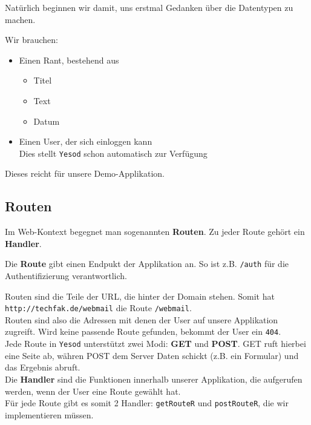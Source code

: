 \documentclass{beamer}
\begin{document}
\begin{frame}[fragile]
Natürlich beginnen wir damit, uns erstmal Gedanken über die Datentypen zu machen.
\pause
\bigskip

Wir brauchen:
\pause

\begin{itemize}
 \item Einen Rant, bestehend aus
       \begin{itemize}
        \item Titel
        \item Text
        \item Datum
       \end{itemize}
 \pause
 \item Einen User, der sich einloggen kann\\\pause
       Dies stellt \texttt{Yesod} schon automatisch zur Verfügung
\end{itemize}
\pause
Dieses reicht für unsere Demo-Applikation.
\end{frame}

\subsection{Routen}
\begin{frame}[fragile]
Im Web-Kontext begegnet man sogenannten \textbf{Routen}. Zu jeder Route gehört ein \textbf{Handler}.
\pause

Die \textbf{Route} gibt einen Endpukt der Applikation an. So ist z.B. \texttt{/auth} für die Authentifizierung verantwortlich.
\pause

Routen sind die Teile der URL, die hinter der Domain stehen. Somit hat \texttt{http://techfak.de/webmail} die Route \texttt{/webmail}.\\\pause
Routen sind also die Adressen mit denen der User auf unsere Applikation zugreift. Wird keine passende Route gefunden, bekommt der User ein \texttt{404}.\\\pause
Jede Route in \texttt{Yesod} unterstützt zwei Modi: \textbf{GET} und \textbf{POST}. GET ruft hierbei eine Seite ab, währen POST dem Server Daten schickt (z.B. ein Formular) und das Ergebnis abruft.\\\pause
Die \textbf{Handler} sind die Funktionen innerhalb unserer Applikation, die aufgerufen werden, wenn der User eine Route gewählt hat.\\\pause
Für jede Route gibt es somit 2 Handler: \texttt{getRouteR} und \texttt{postRouteR}, die wir implementieren müssen.
\end{frame}
\end{document}
